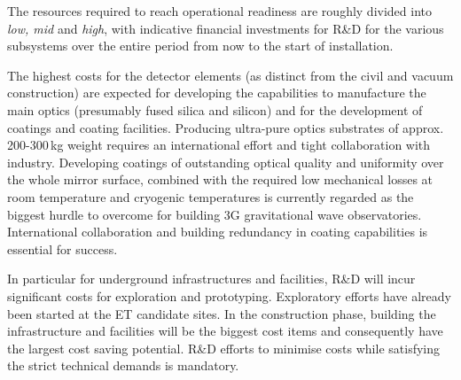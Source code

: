 The resources required to reach operational readiness are roughly divided into \textit{low, mid} and \textit{high}, with indicative financial investments for R\&D for the various subsystems over the entire period from now to the start of installation. 

The highest costs for the detector elements (as distinct from the civil and vacuum construction) are expected for developing the capabilities to manufacture the main optics (presumably fused silica and silicon) and for the development of coatings and coating facilities. 
Producing ultra-pure optics substrates of approx. 200-300\,kg weight requires an international effort and tight collaboration with industry. Developing coatings of outstanding optical quality and uniformity over the whole mirror surface, combined with the required low mechanical losses at  room temperature and cryogenic temperatures is currently regarded as the biggest hurdle to overcome for building 3G gravitational wave observatories. International collaboration and building redundancy in coating capabilities is essential for success.

In particular for underground infrastructures and facilities, R\&D will incur significant costs for exploration and prototyping. Exploratory efforts have already been started at the ET candidate sites. In the construction phase, building the infrastructure and facilities will be the biggest cost items and consequently have the largest cost saving potential. R\&D efforts to minimise costs while satisfying the strict technical demands is mandatory.



